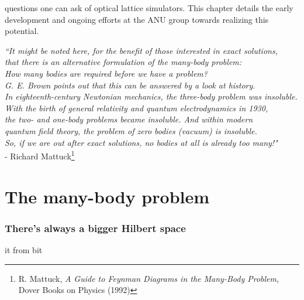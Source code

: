 questions one can ask of optical lattice simulators. This chapter details the early development and ongoing efforts at the ANU \mhe group towards realizing this potential.


\begin{adjustwidth}{1.5cm}{0cm}
\begin{flushright}
\emph{``It might be noted here, for the benefit of those interested in exact solutions, \\
that there is an alternative formulation of the many-body problem:\\
How many bodies are required before we have a problem? \\
G. E. Brown points out that this can be answered by a look at history. \\
In eighteenth-century Newtonian mechanics, the three-body problem was insoluble. \\
With the birth of general relativity and quantum electrodynamics
in 1930,\\ the two- and one-body problems became insoluble. 
And within modern\\
 quantum field theory, the problem of zero bodies
(vacuum) is insoluble. \\
So, if we are out after exact solutions, no bodies at all is already too many!"}\\
 - Richard Mattuck\footnote{R. Mattuck, \emph{A Guide to Feynman Diagrams in the Many-Body Problem}, Dover Books on Physics (1992)}
\end{flushright}
\end{adjustwidth}

\section{The many-body problem}
\subsubsection*{There's always a bigger Hilbert space}

	it from bit

